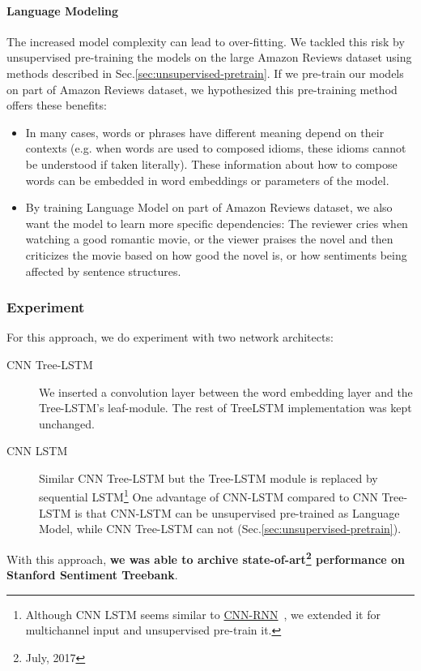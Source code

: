 \paragraph{Language Modeling}
The increased model complexity can lead to over-fitting.
We tackled this risk by unsupervised pre-training the models on the large Amazon Reviews dataset using methods described in Sec.\ref{sec:unsupervised-pretrain}.
If we pre-train our models on part of Amazon Reviews dataset, we hypothesized this pre-training method offers these benefits:
\begin{itemize}
\item In many cases, words or phrases have different meaning depend on their contexts (e.g. when words are used to composed idioms, these idioms cannot be understood if taken literally).
These information about how to compose words can be embedded in word embeddings or parameters of the model.
\item By training Language Model on part of Amazon Reviews dataset, we also want the model to learn more specific dependencies: The reviewer cries when watching a good romantic movie, or the viewer praises the novel and then criticizes the movie based on how good the novel is, or how sentiments being affected by sentence structures. 
\end{itemize} 

\subsubsection{Experiment}
For this approach, we do experiment with two network architects:
\begin{description}
\item[CNN Tree-LSTM] We inserted a convolution layer between the word embedding layer and the Tree-LSTM's leaf-module.
The rest of TreeLSTM implementation was kept unchanged.

\item[CNN LSTM] Similar CNN Tree-LSTM but the Tree-LSTM module is replaced by sequential LSTM\footnote{Although CNN LSTM seems similar to \hyperref[cnn-rnn]{CNN-RNN}~\cite{cnn-rnn}, we extended it for multichannel input and unsupervised pre-train it.}
One advantage of CNN-LSTM compared to CNN Tree-LSTM is that CNN-LSTM can be unsupervised pre-trained as Language Model, while CNN Tree-LSTM can not (Sec.\ref{sec:unsupervised-pretrain}).
\end{description}

With this approach, \textbf{we was able to archive state-of-art\footnote{July, 2017} performance on Stanford Sentiment Treebank}.


